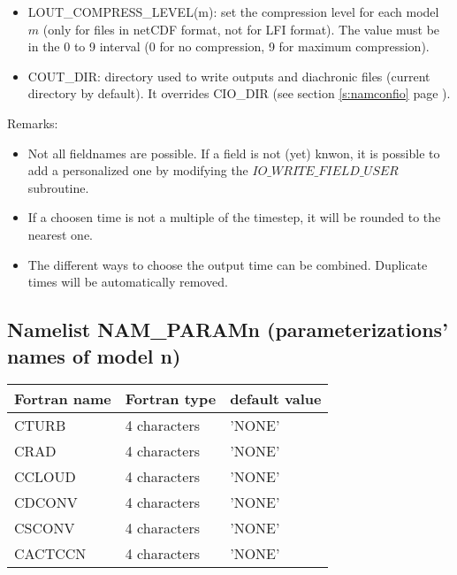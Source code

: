 \begin{itemize}
\item
{} 
LOUT\_COMPRESS\_LEVEL(m): set the compression level for each model $m$ (only for files in netCDF format, not for LFI format). The value must be in the 0 to 9 interval (0 for no compression, 9 for maximum compression).

\item
{} 
COUT\_DIR: directory used to write outputs and diachronic files (current directory by default).
It overrides CIO\_DIR (see section \ref{s:namconfio} page \pageref{s:namconfio}).

\end{itemize}

Remarks:
\begin{itemize}
\item Not all fieldnames are possible. If a field is not (yet) knwon, it is possible to add a personalized one by modifying the $IO\_WRITE\_FIELD\_USER$ subroutine.
\item If a choosen time is not a multiple of the timestep, it will be rounded to the nearest one.
\item The different ways to choose the output time can be combined. Duplicate times will be automatically removed.
\end{itemize}

\subsection{Namelist NAM\_PARAMn (parameterizations' names of model n)}

\begin{center}
\begin{tabular} {|l|l|l|}
\hline
Fortran name & Fortran type & default value \\
\hline
CTURB   &  4 characters  & 'NONE'   \\
CRAD    &  4 characters  & 'NONE'   \\
CCLOUD  &  4 characters  & 'NONE'   \\
CDCONV  &  4 characters  & 'NONE'   \\
CSCONV  &  4 characters  & 'NONE'   \\
CACTCCN &  4 characters  & 'NONE'   \\
\hline
\end{tabular}
\end{center}


